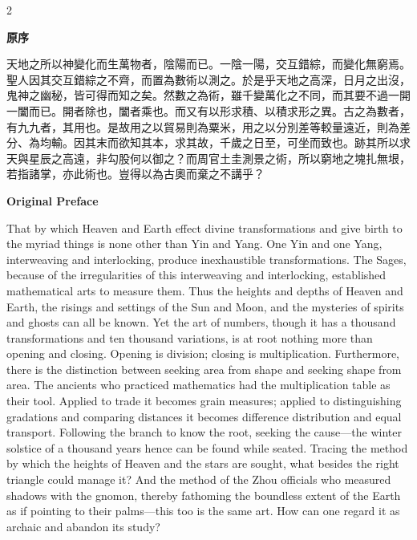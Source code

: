 \documentclass[11pt,a4paper]{article}
\begin{document}
\begin{paracol}{2}

\noindent\textbf{原序}

\medskip

天地之所以神變化而生萬物者，陰陽而已。一陰一陽，交互錯綜，而變化無窮焉。聖人因其交互錯綜之不齊，而置為數術以測之。於是乎天地之高深，日月之出沒，鬼神之幽秘，皆可得而知之矣。然數之為術，雖千變萬化之不同，而其要不過一開一闔而已。開者除也，闔者乘也。而又有以形求積、以積求形之異。古之為數者，有九九者，其用也。是故用之以貿易則為粟米，用之以分別差等較量遠近，則為差分、為均輸。因其末而欲知其本，求其故，千歲之日至，可坐而致也。跡其所以求天與星辰之高遠，非勾股何以御之？而周官土圭測景之術，所以窮地之塊扎無垠，若指諸掌，亦此術也。豈得以為古奧而棄之不講乎？

\switchcolumn

\noindent\textbf{Original Preface}

\medskip

That by which Heaven and Earth effect divine transformations and give birth to the myriad things is none other than Yin and Yang. One Yin and one Yang, interweaving and interlocking, produce inexhaustible transformations. The Sages, because of the irregularities of this interweaving and interlocking, established mathematical arts to measure them. Thus the heights and depths of Heaven and Earth, the risings and settings of the Sun and Moon, and the mysteries of spirits and ghosts can all be known. Yet the art of numbers, though it has a thousand transformations and ten thousand variations, is at root nothing more than opening and closing. Opening is division; closing is multiplication. Furthermore, there is the distinction between seeking area from shape and seeking shape from area. The ancients who practiced mathematics had the multiplication table as their tool. Applied to trade it becomes grain measures; applied to distinguishing gradations and comparing distances it becomes difference distribution and equal transport. Following the branch to know the root, seeking the cause---the winter solstice of a thousand years hence can be found while seated. Tracing the method by which the heights of Heaven and the stars are sought, what besides the right triangle could manage it? And the method of the Zhou officials who measured shadows with the gnomon, thereby fathoming the boundless extent of the Earth as if pointing to their palms---this too is the same art. How can one regard it as archaic and abandon its study?

\switchcolumn


\end{paracol}
\end{document}
